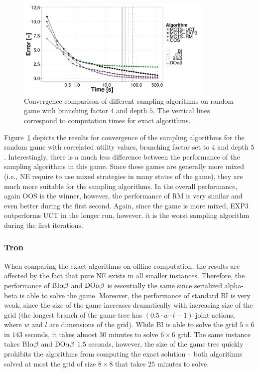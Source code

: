 \begin{figure}
\centering
\includegraphics[width=0.85\textwidth]{figures/convergence-rg-fix.pdf}
\caption{Convergence comparison of different sampling algorithms on random game with branching factor $4$ and depth $5$. The vertical lines correspond to computation times for exact algorithms.} \label{fig:off:conv:rg}
\end{figure}

Figure~\ref{fig:off:conv:rg} depicts the results for convergence of the sampling algorithms for the random game with correlated utility values, branching factor set to $4$ and depth $5$. Interestingly, there is a much less difference between the performance of the sampling algorithms in this game. Since these games are generally more mixed (i.e., NE require to use mixed strategies in many states of the game), they are much more suitable for the sampling algorithms. In the overall performance, again OOS is the winner, however, the performance of RM is very similar and even better during the first second. Again, since the game is more mixed, EXP3 outperforms UCT in the longer run, however, it is the worst sampling algorithm during the first iterations.

\subsubsection{Tron}
When comparing the exact algorithms on offline computation, the results are affected by the fact that pure NE exists in all smaller instances.
Therefore, the performance of $\textrm{BI}\alpha\beta$ and $\textrm{DO}\alpha\beta$ is essentially the same since serialized alpha-beta is able to solve the game. Moreover, the performance of standard BI is very weak, since the size of the game increases dramatically with increasing size of the grid (the longest branch of the game tree has $\left(0.5\cdot w\cdot l - 1\right)$ joint actions, where $w$ and $l$ are dimensions of the grid). While BI is able to solve the grid $5\times6$ in $143$ seconds, it takes almost $30$ minutes to solve $6\times6$ grid. The same instance takes $\textrm{BI}\alpha\beta$ and $\textrm{DO}\alpha\beta$ $1.5$ seconds, however, the size of the game tree quickly prohibits the algorithms from computing the exact solution -- both algorithms solved at most the grid of size $8\times8$ that takes $25$ minutes to solve. 

